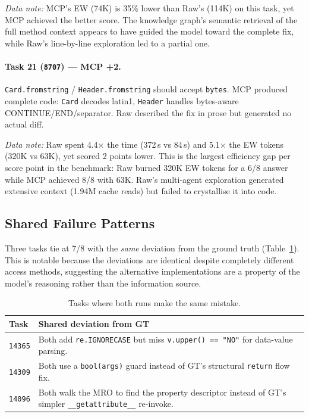 \emph{Data note:} MCP's EW (74K) is 35\% lower than Raw's (114K) on
this task, yet MCP achieved the better score.  The knowledge graph's
semantic retrieval of the full method context appears to have guided
the model toward the complete fix, while Raw's line-by-line
exploration led to a partial one.

\paragraph{Task 21 (\texttt{8707}) --- MCP +2.}
\texttt{Card.fromstring} / \texttt{Header.fromstring} should accept
\texttt{bytes}.
MCP produced complete code: \texttt{Card} decodes latin1,
\texttt{Header} handles bytes-aware CONTINUE/END/separator.
Raw described the fix in prose but generated no actual diff.

\emph{Data note:} Raw spent 4.4$\times$ the time (372\,s vs 84\,s)
and 5.1$\times$ the EW tokens (320K vs 63K), yet scored 2 points
lower.  This is the largest efficiency gap per score point in the
benchmark: Raw burned 320K EW tokens for a 6/8 answer while MCP
achieved 8/8 with 63K.  Raw's multi-agent exploration generated
extensive context (1.94M cache reads) but failed to crystallise it
into code.

\subsection{Shared Failure Patterns}\label{sec:shared}

Three tasks tie at 7/8 with the \emph{same} deviation from the
ground truth (Table~\ref{tab:shared-fail}).  This is notable because
the deviations are identical despite completely different access
methods, suggesting the alternative implementations are a property of
the model's reasoning rather than the information source.

\begin{table}[h]
\centering
\caption{Tasks where both runs make the same mistake.}\label{tab:shared-fail}
\begin{tabular}{lp{9cm}}
\toprule
\textbf{Task} & \textbf{Shared deviation from GT} \\
\midrule
\texttt{14365} & Both add \texttt{re.IGNORECASE} but miss \texttt{v.upper() == "NO"} for data-value parsing. \\
\texttt{14309} & Both use a \texttt{bool(args)} guard instead of GT's structural \texttt{return} flow fix. \\
\texttt{14096} & Both walk the MRO to find the property descriptor instead of GT's simpler \texttt{\_\_getattribute\_\_} re-invoke. \\
\bottomrule
\end{tabular}
\end{table}

